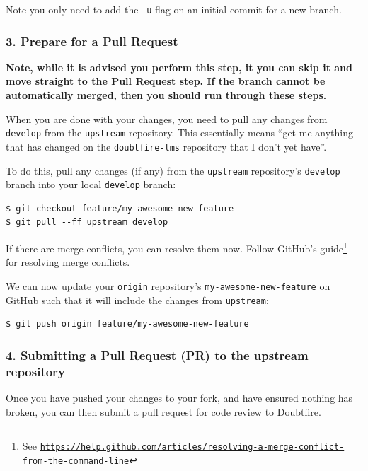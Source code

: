 \documentclass[12pt,a4paper,]{article}
\renewcommand{\href}[2]{#2\footnote{See \texttt{\url{#1}}}}
\begin{document}
Note you only need to add the \texttt{-u} flag on an initial commit for
a new branch.

\subsubsection{3. Prepare for a Pull
Request}\label{prepare-for-a-pull-request}

\textbf{Note, while it is advised you perform this step, it you can skip
it and move straight to the
\protect\hyperlink{4-submitting-a-pull-request-pr-to-the-upstream-repository}{Pull
Request step}. If the branch cannot be automatically merged, then you
should run through these steps.}

When you are done with your changes, you need to pull any changes from
\texttt{develop} from the \texttt{upstream} repository. This essentially
means ``get me anything that has changed on the \texttt{doubtfire-lms}
repository that I don't yet have''.

To do this, pull any changes (if any) from the \texttt{upstream}
repository's \texttt{develop} branch into your local \texttt{develop}
branch:

\begin{verbatim}
$ git checkout feature/my-awesome-new-feature
$ git pull --ff upstream develop
\end{verbatim}

If there are merge conflicts, you can resolve them now. Follow GitHub's
\href{https://help.github.com/articles/resolving-a-merge-conflict-from-the-command-line}{guide}
for resolving merge conflicts.

We can now update your \texttt{origin} repository's
\texttt{my-awesome-new-feature} on GitHub such that it will include the
changes from \texttt{upstream}:

\begin{verbatim}
$ git push origin feature/my-awesome-new-feature
\end{verbatim}

\subsubsection{4. Submitting a Pull Request (PR) to the upstream
repository}\label{submitting-a-pull-request-pr-to-the-upstream-repository}

Once you have pushed your changes to your fork, and have ensured nothing
has broken, you can then submit a pull request for code review to
Doubtfire.
\end{document}

